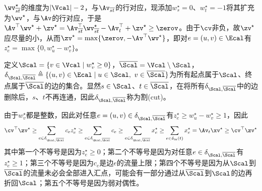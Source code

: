 \documentclass{ctexart}
\begin{document}
$\wv_{\overline{st}}^\star$的维度为$|\Vcal| - 2$，与$\Av_{\overline{st}}$的行对应，现添加$w_s^\star = 0$、$w_t^\star = -1$将其扩充为$\wv^\star$，与$\Av$的行对应，于是$\Av^\top \wv^\star + \zv^\star = \Av_{\overline{st}}^\top \wv_{\overline{st}}^\star - \Av_t^\top + \zv^\star \ge \zerov$。由于$\cv$非负，故$\zv^\star$应尽量的小，从而$\zv^\star = \max \{ \zerov, - \Av^\top \wv^\star \}$，即对$e = (u,v) \in \Ecal$有$z^\star_e = \max \{ 0, w_u^\star - w_v^\star \}$。

定义$\Scal = \{ v \in \Vcal \mid w_v^\star \ge 0 \}$，$\overline{\Scal} = \Vcal \setminus \Scal$，$\delta_{\Scal, \overline{\Scal}} \triangleq \{ (u,v) \in \Ecal \mid u \in \Scal, ~ v \in \overline{\Scal} \}$为所有起点属于$\Scal$、终点属于$\overline{\Scal}$的边的集合。显然$s \in \Scal$、$t \in \overline{\Scal}$，在将所有$\delta_{\Scal, \overline{\Scal}}$中的边删除后，$s$、$t$不再连通，因此$\delta_{\Scal, \overline{\Scal}}$称为割(cut)。

由于$w_v^\star$都是整数，因此对任意$e = (u,v) \in \delta_{\Scal, \overline{\Scal}}$有$z_e^\star \ge w_u^\star - w_v^\star \ge 1$，因此
\begin{align*}
    \cv^\top \zv^\star \ge \sum_{e \in \delta_{\Scal, \overline{\Scal}}} c_e z_e^\star \ge \sum_{e \in \delta_{\Scal, \overline{\Scal}}} c_e \ge \sum_{e \in \delta_{\Scal, \overline{\Scal}}} x_e^\star \ge \sum_{e \in \delta_{\text{in}}(t)} x_e^\star = \Av_t \xv^\star \ge \cv^\top \zv^\star
\end{align*}
其中第一个不等号是因为$z_e^\star \ge 0$；第二个不等号是因为对任意$e \in \delta_{\Scal, \overline{\Scal}}$有$z_e^\star \ge 1$；第三个不等号是因为$c_e$是边$e$的流量上限；第四个不等号是因为从$\Scal$到$\overline{\Scal}$的流量未必会全部进入汇点，可能会有一部分通过从$\overline{\Scal}$到$\Scal$的边再折回$\Scal$；第五个不等号是因为弱对偶性。
\end{document}
